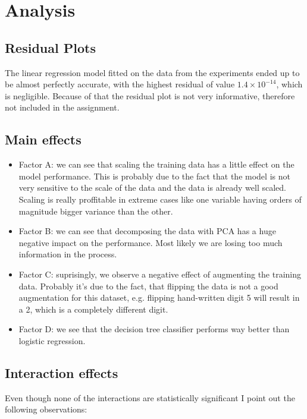 \documentclass{article}
\begin{document}
\section{Analysis}

\subsection{Residual Plots}
The linear regression model fitted on the data from the experiments ended up to be almost perfectly accurate, with the highest residual of value $1.4\times10^{-14}$, which is negligible. Because of that the residual plot is not very informative, therefore not included in the assignment.

\subsection{Main effects}

\begin{itemize}
    \item Factor A: we can see that scaling the training data has a little effect on the model performance. This is probably due to the fact that the model is not very sensitive to the scale of the data and the data is already well scaled. Scaling is really proffitable in extreme cases like one variable having orders of magnitude bigger variance than the other.
    \item Factor B: we can see that decomposing the data with PCA has a huge negative impact on the performance. Most likely we are losing too much information in the process.
    \item Factor C: suprisingly, we observe a negative effect of augmenting the training data. Probably it's due to the fact, that flipping the data is not a good augmentation for this dataset, e.g. flipping hand-written digit 5 will result in a 2, which is a completely different digit.
    \item Factor D: we see that the decision tree classifier performs way better than logistic regression.
\end{itemize}

\subsection{Interaction effects}

Even though none of the interactions are statistically significant I point out the following observations:
\end{document}
